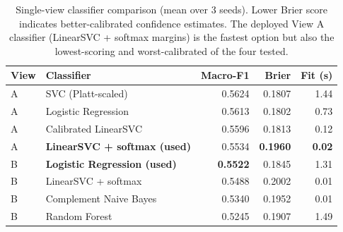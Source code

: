 %
%

\begin{table}[H]
\centering
\begin{tabular}{llrrr}
\toprule
\textbf{View} & \textbf{Classifier} & \textbf{Macro-F1} & \textbf{Brier} & \textbf{Fit (s)} \\
\midrule
A & SVC (Platt-scaled)                  & 0.5624 & 0.1807 & 1.44 \\
A & Logistic Regression                 & 0.5613 & 0.1802 & 0.73 \\
A & Calibrated LinearSVC                & 0.5596 & 0.1813 & 0.12 \\
A & \textbf{LinearSVC + softmax (used)} & 0.5534 & \textbf{0.1960} & \textbf{0.02} \\
\midrule
B & \textbf{Logistic Regression (used)} & \textbf{0.5522} & 0.1845 & 1.31 \\
B & LinearSVC + softmax                 & 0.5488 & 0.2002 & 0.01 \\
B & Complement Naive Bayes              & 0.5340 & 0.1952 & 0.01 \\
B & Random Forest                       & 0.5245 & 0.1907 & 1.49 \\
\bottomrule
\end{tabular}
\caption{Single-view classifier comparison (mean over 3 seeds). Lower Brier
score indicates better-calibrated confidence estimates. The deployed View A
classifier (LinearSVC + softmax margins) is the fastest option but also the
lowest-scoring and worst-calibrated of the four tested.}
\label{tab:classifier-comparison}
\end{table}

